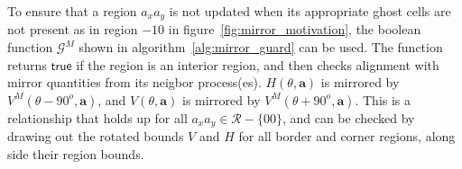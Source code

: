 To ensure that
a region $a_xa_y$ is not updated when its appropriate ghost cells are not present
as in region $-10$ in figure~\ref{fig:mirror_motivation}, the boolean function
$\mathcal{G}^M$ shown in algorithm~\ref{alg:mirror_guard} can be used.  The function
returns $\textsf{true}$ if the region is an interior region, and then checks alignment
with mirror quantities from its neigbor process(es).  $H(\theta,\mathbf{a})$ is
mirrored by $V^M(\theta - 90^o,\mathbf{a})$, and $V(\theta,\mathbf{a})$ is mirrored
by $V^M(\theta + 90^o,\mathbf{a})$.  This is a relationship that holds up for all
$a_xa_y \in \mathcal{R} - \{00\}$, and can be checked by drawing out the rotated bounds
$V$ and $H$ for all border and corner regions, along side their region bounds.



